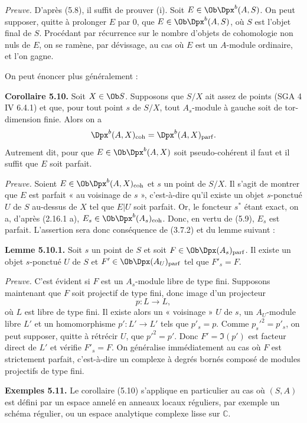 \documentclass[11pt]{article}
\begin{document}
\emph{Preuve.} D'après (5.8), il suffit de prouver (i). Soit \(E\in\Ob\Dpx^b(A,S)\). On peut supposer, quitte à prolonger \(E\) par \(0\), que \(E\in\Ob\Dpx^b(A,S)\), où \(S\) est l'objet final de \(S\). Procédant par récurrence sur le nombre d'objets de cohomologie non nuls de \(E\), on se ramène, par dévissage, au cas où \(E\) est un \(A\)-module ordinaire, et l'on gagne.

On peut énoncer plus généralement :

\textbf{Corollaire 5.10.} Soit \(X\in\Ob S\). Supposons que \(S/X\) ait assez de points (SGA 4 IV 6.4.1) et que, pour tout point \(s\) de \(S/X\), tout \(A_s\)-module à gauche soit de tor-dimension finie. Alors on a
\[
  \Dpx^b(A,X)_{\mathrm{coh}}=\Dpx^b(A,X)_{\mathrm{parf}}.
\]
Autrement dit, pour que \(E\in\Ob\Dpx^b(A,X)\) soit pseudo-cohérent il faut et il suffit que \(E\) soit parfait.

\emph{Preuve.} Soient \(E\in\Ob\Dpx^b(A,X)_{\mathrm{coh}}\) et \(s\) un point de \(S/X\). Il s'agit de montrer que \(E\) est parfait « au voisinage de \(s\) », c'est-à-dire qu'il existe un objet \(s\)-ponctué \(U\) de \(S\) au-dessus de \(X\) tel que \(E|U\) soit parfait. Or, le foncteur \(s^*\) étant exact, on a, d'après (2.16.1 a), \(E_s\in\Ob\Dpx^b(A_s)_{\mathrm{coh}}\). Donc, en vertu de (5.9), \(E_s\) est parfait. L'assertion sera donc conséquence de (3.7.2) et du lemme suivant :

\textbf{Lemme 5.10.1.} Soit \(s\) un point de \(S\) et soit \(F\in\Ob\Dpx(A_s)_{\mathrm{parf}}\). Il existe un objet \(s\)-ponctué \(U\) de \(S\) et \(F'\in\Ob\Dpx(A_U)_{\mathrm{parf}}\) tel que \(F'_s=F\).

\emph{Preuve.} C'est évident si \(F\) est un \(A_s\)-module libre de type fini. Supposons maintenant que \(F\) soit projectif de type fini, donc image d'un projecteur
\[
  p:L\longrightarrow L,
\]
où \(L\) est libre de type fini. Il existe alors un « voisinage » \(U\) de \(s\), un \(A_U\)-module libre \(L'\) et un homomorphisme \(p':L'\to L'\) tels que \(p'_s=p\). Comme \(p_s'^2=p'_s\), on peut supposer, quitte à rétrécir \(U\), que \(p'^2=p'\). Donc \(F'=\Im(p')\) est facteur direct de \(L'\) et vérifie \(F'_s=F\). On généralise immédiatement au cas où \(F\) est strictement parfait, c'est-à-dire un complexe à degrés bornés composé de modules projectifs de type fini.

\textbf{Exemples 5.11.} Le corollaire (5.10) s'applique en particulier au cas où \((S,A)\) est défini par un espace annelé en anneaux locaux réguliers, par exemple un schéma régulier, ou un espace analytique complexe lisse sur \(\mathbb C\).
\end{document}
